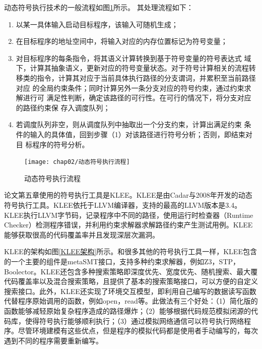 动态符号执行技术的一般流程如图\ref{动态符号执行流程}所示。 其处理流程如下：
\begin{enumerate}[(1)]
\item 以某一具体输入启动目标程序，该输入可随机生成；
\item 在目标程序的地址空间中，将输入对应的内存位置标记为符号变量；
\item 对目标程序的每条指令，将其语义计算转换到基于符号变量的符号表达式
域下，计算其抽象语义，更新对应的符号变量状态。对于符号计算相关的流程转
移类的指令，计算其对应于当前具体执行路径的分支谓词，并累积至当前路径对应
的全局约束条件；同时计算另外一条分支对应的符号约束，通过约束求解进行可
满足性判断，确定该路径的可行性。在可行的情况下，将分支对应的路径约束保
存入调度队列；
\item 若调度队列非空，则从调度队列中抽取出一个分支约束，计算出满足约束
条件的输入的具体值，回到步骤（1）对该路径进行符号分析；否则，即结束对目
标程序的符号分析。
\end{enumerate}

\begin{figure}[h]
\begin{center}
\texttt{[image: chap02/动态符号执行流程]}
\end{center}
\caption{动态符号执行流程}
\label{动态符号执行流程}
\end{figure}

论文第五章使用的符号执行工具是KLEE。KLEE是由Cadar与2008年开发的动态符号执行工具。KLEE依托于LLVM编译器，支持的最高的LLVM版本是3.4。KLEE执行LLVM字节码，记录程序中不同的路径，使用运行时检查器（Runtime Checker）检测程序错误，并利用约束求解器求解路径约束产生测试用例。KLEE能够获取很高的代码覆盖率并且发现深层次漏洞。

KLEE的架构如图\ref{KLEE架构}所示。和很多其他的符号执行工具一样，KLEE包含的一个主要的组件是metaSMT接口，支持多种约束求解器，例如Z3，STP，Boolector。KLEE还包含多种搜索策略即深度优先、宽度优先、随机搜索、最大覆代码覆盖率以及混合搜索策略，且提供了基本的搜索策略接口，可以方便的自定义搜索接口。此外，KLEE还实现了环境交互模型，即利用自己编写的数据读写函数代替程序原始调用的函数，例如open，read等。此做法有三个好处：（1）简化版的函数能够减轻原始复杂程序造成的路径爆炸；（2）能够根据代码规范模拟闭源的代码库，使得符号执行能够顺利执行；（3）通过模拟网络通信可以符号执行网络程序。尽管环境建模有这些优点，但是程序的模拟代码都是使用者手动编写的，每次遇到不同的程序需要重新编写。

